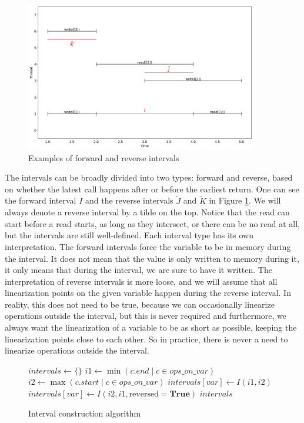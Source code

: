 \documentclass[oneside, a4paper, onecolumn, 10pt]{article}
\begin{document}
\begin{figure}[h]
  \centering
  \includegraphics[width=0.9\textwidth]{assets/intervals_example.png}
  \caption{\label{Interval Examples}Examples of forward and reverse intervals}
\end{figure}
The intervals can be broadly divided into two types: forward and reverse, based on whether the latest call happens after or before the earliest return. One can see the forward interval $I$ and the reverse intervals $\tilde{J}$ and $\tilde{K}$ in Figure \ref{Interval Examples}. We will always denote a reverse interval by a tilde on the top. Notice that the read can start before a read starts, as long as they intersect, or there can be no read at all, but the intervals are still well-defined. Each interval type has its own interpretation. The forward intervals force the variable to be in memory during the interval. It does not mean that the value is only written to memory during it, it only means that during the interval, we are sure to have it written. The interpretation of reverse intervals is more loose, and we will assume that all linearization points on the given variable happen during the reverse interval. In reality, this does not need to be true, because we can occasionally linearize operations outside the interval, but this is never required and furthermore, we always want the linearization of a variable to be as short as possible, keeping the linearization points close to each other. So in practice, there is never a need to linearize operations outside the interval.
\begin{figure}[h]
  \begin{algorithmic}[1]
    \State $intervals \gets \texttt{\{\}}$
    \State $i1 \gets \min(c.end \mid c \in ops\_on\_var)$
    \State $i2 \gets \max(c.start \mid c \in ops\_on\_var)$
    \State $intervals[var] \gets I(i1, i2)$
    \Else
    \State $intervals[var] \gets I(i2, i1, \text{reversed}=\textbf{True})$
    \EndIf
    \EndFor
    \State \Return $intervals$
    \EndFunction
  \end{algorithmic}
  \caption{\label{Interval-making}Interval construction algorithm}
\end{figure}
\end{document}

